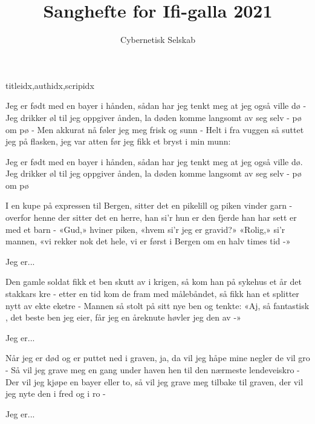 \documentclass[14pt,letterpaper,norsk]{article}
\title{Sanghefte for Ifi-galla 2021}
\author{Cybernetisk Selskab}
\date{}
\begin{document}

\newpage



\begin{songs}{titleidx,authidx,scripidx}


\begin{intersong*}
{%
\parindent 0pt
\noindent
\ifx\preLilyPondExample \undefined
\else
  \expandafter\preLilyPondExample
\fi
\def\lilypondbook{}%

\ifx\postLilyPondExample \undefined
\else
  \expandafter\postLilyPondExample
\fi
}
\end{intersong*}
    

\beginverse
Jeg er født med en bayer i hånden,
sådan har jeg tenkt meg at jeg også ville dø -
Jeg drikker øl til jeg oppgiver ånden,
la døden komme langsomt av seg selv - pø om pø -
Men akkurat nå føler jeg meg frisk og sunn -
Helt i fra vuggen så suttet jeg på flasken,
jeg var atten før jeg fikk et bryst i min munn:
\endverse

\beginchorus
Jeg er født med en bayer i hånden,
sådan har jeg tenkt meg at jeg også ville dø.
Jeg drikker øl til jeg oppgiver ånden,
la døden komme langsomt av seg selv - pø om pø
\endchorus

\beginverse
I en kupe på expressen til Bergen,
sitter det en pikelill og piken vinder garn -
overfor henne der sitter det en herre,
han si'r hun er den fjerde han har sett er med et barn -
«Gud,» hviner piken, «hvem si'r jeg er gravid?»
«Rolig,» si'r mannen, «vi rekker nok det hele,
vi er først i Bergen om en halv times tid -»
\endverse

\beginchorus
Jeg er...
\endchorus

\beginverse
Den gamle soldat fikk et ben skutt av i krigen,
så kom han på sykehus et år det stakkars kre -
etter en tid kom de fram med målebåndet,
så fikk han et splitter nytt av ekte eketre -
Mannen så stolt på sitt nye ben og tenkte:
«Aj, så fantastisk , det beste ben jeg eier,
får jeg en åreknute høvler jeg den av -»
\endverse

\beginchorus
Jeg er...
\endchorus

\beginverse
Når jeg er død og er puttet ned i graven,
ja, da vil jeg håpe mine negler de vil gro -
Så vil jeg grave meg en gang under haven
hen til den nærmeste lendeveiskro -
Der vil jeg kjøpe en bayer eller to,
så vil jeg grave meg tilbake til graven,
der vil jeg nyte den i fred og i ro -
\endverse

\beginchorus
Jeg er...
\endchorus
\endsong







\end{songs}
\end{document}
